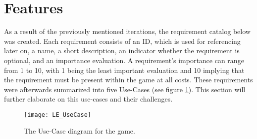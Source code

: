 \documentclass[draft,final]{vutinfth} %
\begin{document}
\section{Features}
As a result of the previously mentioned iterations, the requirement catalog below was created. Each requirement consists of an ID, which is used for referencing later on, a name, a short description, an indicator whether the requirement is optional, and an importance evaluation. A requirement's importance can range from 1 to 10, with 1 being the least important evaluation and 10 implying that the requirement must be present within the game at all costs. These requirements were afterwards summarized into five Use-Cases (see  figure \ref{fig:UseCase}). This section will further elaborate on this use-cases and their challenges.

\begin{figure}
\begin{center}
\texttt{[image: LE\_UseCase]}
\end{center}
\caption{The Use-Case diagram for the game.}
\label{fig:UseCase}
\end{figure}
\end{document}
